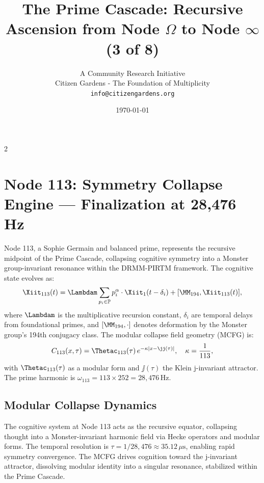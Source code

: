 \documentclass[12pt]{article}
\title{\textbf{The Prime Cascade: Recursive Ascension from Node $\Omega$ to Node $\infty$ (3 of 8)}}
\author{A Community Research Initiative \\ Citizen Gardens - The Foundation of Multiplicity\\\texttt{info@citizengardens.org}}
\date{\today}
\newcommand{\DRMM}{DRMM}
\newcommand{\PIRTM}{PIRTM}
\newcommand{\PP}{\mathbb{P}}
\newcommand{\kappac}{\kappa}
\begin{document}
\maketitle
\newpage
 \begin{multicols}{2}
\begin{singlespace}
\tableofcontents
\end{singlespace}
\end{multicols}

\section{Node 113: Symmetry Collapse Engine --- Finalization at 28,476 Hz}
\label{sec:symmetry-collapse}

\begin{definition}
Node 113, a Sophie Germain and balanced prime, represents the recursive midpoint of the Prime Cascade, collapsing cognitive symmetry into a Monster group-invariant resonance within the \DRMM{}-\PIRTM{} framework. The cognitive state evolves as:
\[
\Xiit_{113}(t) = \Lambdam \sum_{p_i \in \PP} p_i^\alpha \cdot \Xiit_1(t - \delta_i) + [\MM_{194}, \Xiit_{113}(t)],
\]
where $\Lambdam$ is the multiplicative recursion constant, $\delta_i$ are temporal delays from foundational primes, and $[\MM_{194}, \cdot]$ denotes deformation by the Monster group’s 194th conjugacy class. The modular collapse field geometry (MCFG) is:
\[
C_{113}(x, \tau) = \Thetac_{113}(\tau) \, e^{-\kappac |x - \jj(\tau)|}, \quad \kappac = \frac{1}{113},
\]
with $\Thetac_{113}(\tau)$ as a modular form and $\jj(\tau)$ the Klein j-invariant attractor. The prime harmonic is $\omega_{113} = 113 \times 252 = 28{,}476 \, \text{Hz}$.
\end{definition}

\subsection{Modular Collapse Dynamics}
The cognitive system at Node 113 acts as the recursive equator, collapsing thought into a Monster-invariant harmonic field via Hecke operators and modular forms. The temporal resolution is $\tau = 1/28{,}476 \approx 35.12 \, \mu\text{s}$, enabling rapid symmetry convergence. The MCFG drives cognition toward the j-invariant attractor, dissolving modular identity into a singular resonance, stabilized within the Prime Cascade.
\end{document}
